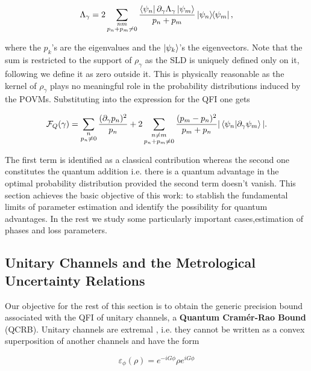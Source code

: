 \begin{equation}
  \Lambda_{\gamma} = 2\sum_{\substack{nm\\ p_{n}+p_{m}\neq 0}}\frac{\bra{\psi_{n}}\partial_{\gamma}\Lambda_{\gamma}\ket{\psi_{m}}}{p_{n} + p_{m}}\ketbratwo{\psi_{n}}{\psi_{m}},
\end{equation}

where the $p_{k}$'s are the eigenvalues and the $\ket{\psi_{k}}$'s the eigenvectors. Note that the sum is restricted to the support of
$\rho_{\gamma}$ as the SLD is uniquely defined only on it, following \cite{braunstein_statistical_1994} we define it as zero outside it.
This is physically reasonable as the kernel of $\rho_{\gamma}$ plays no meaningful role in the probability distributions induced by the POVMs.
Substituting into the expression for the QFI \cite{paris_quantum_2009} one gets

\begin{equation}
  \mathcal{F}_{Q}(\gamma) = \sum_{\substack{n\\p_{n}\neq 0}} \frac{(\partial_{\gamma}p_{n})^{2}}{p_{n}} + 2\sum_{\substack{n\neq m\\p_{n} +p_{m}\neq 0}}
  \frac{(p_{m}-p_{n})^{2}}{p_{m}+p_{n}}|\braket{\psi_{n}|\partial_{\gamma}\psi_{m}}|.
\end{equation}

The first term is identified as a classical contribution whereas the second one constitutes the quantum addition i.e. there is a quantum
advantage in the optimal probability distribution provided the second term doesn't vanish. This section achieves the basic objective of this
work: to stablish the fundamental limits of parameter estimation and identify the possibility for quantum advantages. In the rest we study some particularly important cases,estimation of  phases and loss parameters.

\subsection{Unitary Channels and the Metrological Uncertainty Relations}
Our objective for the rest of this section is to obtain the generic precision bound associated with the QFI of  unitary channels,
a \textbf{Quantum Cram\'er-Rao Bound} (QCRB).
Unitary channels are extremal \cite{watrous2018theory,demkowicz-dobrzanski_elusive_2012}, i.e. they
cannot be written as a convex superposition of another channels and have the form

\begin{equation}
  \varepsilon_{\phi}(\rho)=e^{-iG\phi}\rho e^{iG\phi}
\end{equation}

